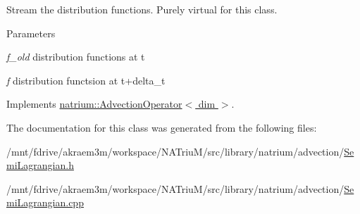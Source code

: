 Stream the distribution functions. Purely virtual for this class. 
\begin{DoxyParams}{Parameters}
\item[{\em f\_\-old}]distribution functions at t \item[{\em f}]distribution functsion at t+delta\_\-t \end{DoxyParams}


Implements \hyperlink{classnatrium_1_1AdvectionOperator_abccc060e37071fa776cd6e9fc6cc7987}{natrium::AdvectionOperator$<$ dim $>$}.

The documentation for this class was generated from the following files:\begin{DoxyCompactItemize}
\item 
/mnt/fdrive/akraem3m/workspace/NATriuM/src/library/natrium/advection/\hyperlink{SemiLagrangian_8h}{SemiLagrangian.h}\item 
/mnt/fdrive/akraem3m/workspace/NATriuM/src/library/natrium/advection/\hyperlink{SemiLagrangian_8cpp}{SemiLagrangian.cpp}\end{DoxyCompactItemize}
